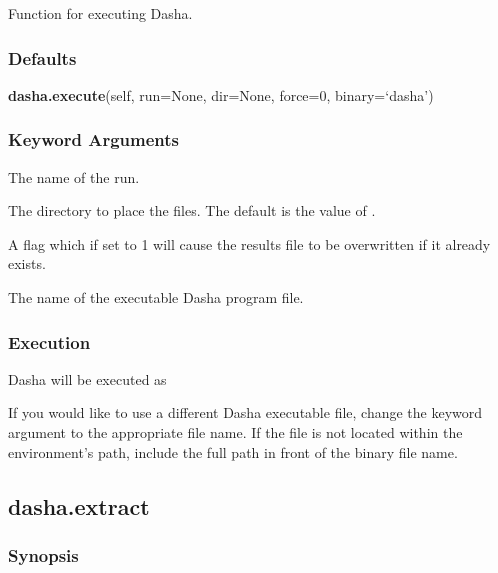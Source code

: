  Function for executing Dasha. 
  

  
 \subsubsection{Defaults} 

 \textsf{\textbf{dasha.execute}(self, run=None, dir=None, force=0, binary=`dasha')} 

  
 \subsubsection{Keyword Arguments} 

   The name of the run.   

   The directory to place the files.  The default is the value of .   

   A flag which if set to 1 will cause the results file to be overwritten if it already exists.   

   The name of the executable Dasha program file.  

  

  
 \subsubsection{Execution} 

 Dasha will be executed as 
  


 If you would like to use a different Dasha executable file, change the keyword argument  to the appropriate file name.  If the file is not located within the environment's path, include the full path in front of the binary file name. 
  

  

 \newpage 

 \subsection{dasha.extract} 

  
 \subsubsection{Synopsis} 


